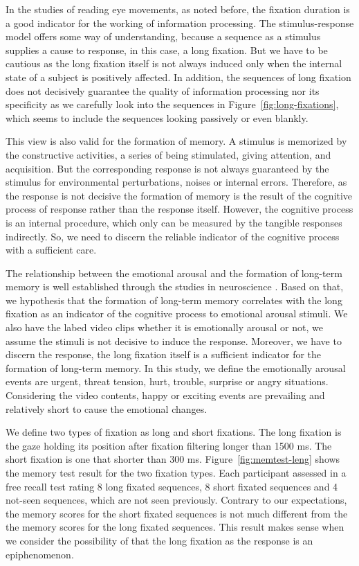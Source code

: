 \documentclass[10pt,letterpaper]{article}
\begin{document}
In the studies of reading eye movements, as noted before, the fixation duration is a good indicator for the working of information processing. The stimulus-response model offers some way of understanding, because a sequence as a stimulus supplies a cause to response, in this case, a long fixation. But we have to be cautious as the long fixation itself is not always induced only when the internal state of a subject is positively affected. In addition, the sequences of long fixation does not decisively guarantee the quality of information processing nor its specificity as we carefully look into the sequences in Figure~\ref{fig:long-fixations}, which seems to include the sequences looking passively or even blankly. 

This view is also valid for the formation of memory. A stimulus is memorized by the constructive activities, a series of being stimulated, giving attention, and acquisition. But the corresponding response is not always guaranteed by the stimulus for environmental perturbations, noises or internal errors. Therefore, as the response is not decisive the formation of memory is the result of the cognitive process of response rather than the response itself. However, the cognitive process is an internal procedure, which only can be measured by the tangible responses indirectly. So, we need to discern the reliable indicator of the cognitive process with a sufficient care. 

The relationship between the emotional arousal and the formation of long-term memory is well established through the studies in neuroscience \cite{Cahill1996amyg,Cahill1998baso}. Based on that, we hypothesis that the formation of long-term memory correlates with the long fixation as an indicator of the cognitive process to emotional arousal stimuli. We also have the labed video clips whether it is emotionally arousal or not, we assume the stimuli is not decisive to induce the response. Moreover, we have to discern the response, the long fixation itself is a sufficient indicator for the formation of long-term memory. In this study, we define the emotionally arousal events are urgent, threat
tension, hurt, trouble, surprise or angry situations. Considering the video contents, happy or exciting events are prevailing and relatively short to cause the emotional changes.

We define two types of fixation as long and short fixations. The long fixation is the gaze holding its position after fixation filtering longer than 1500 ms. The short fixation is one that shorter than 300 ms. Figure~\ref{fig:memtest-leng} shows the memory test result for the two fixation types. Each participant assessed in a free recall test rating 8 long fixated sequences, 8 short fixated sequences and 4 not-seen sequences, which are not seen previously. Contrary to our expectations, the memory scores for the short fixated sequences is not much different from the the memory scores for the long fixated sequences. This result makes sense when we consider the possibility of that the long fixation as the response is an epiphenomenon.
\end{document}
